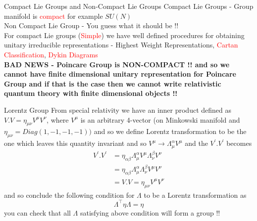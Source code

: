 \documentclass{beamer}
\begin{document}
\begin{frame}{Compact Lie Groups and Non-Compact Lie Groups}
Compact Lie Groups - Group manifold is \textcolor{red}{compact} for example $SU(N)$ \\
\vspace{5mm}
Non Compact Lie Group - You guess what it should be !! \\
\vspace{8mm}
For compact Lie groups (\textcolor{red}{Simple}) we have well defined procedures for obtaining unitary irreducible representations - Highest Weight Representations, \textcolor{red}{Cartan Classification}, \textcolor{red}{Dykin Diagrams} \\
\vspace{10mm} 
\textbf{BAD NEWS - Poincare Group is NON-COMPACT !! and so we cannot have finite dimensional unitary representation for Poincare Group and if that is the case then we cannot write relativistic quantum theory with finite dimensional objects !!}
\end{frame}
\begin{frame}{Lorentz Group}
    From special relativity we have an inner product defined as $V.V = \eta_{\mu\nu}V^{\mu}V^{\nu}$, where $V^{\mu}$ is an arbitrary 4-vector (on Minkowski manifold and $\eta_{\mu\nu} = Diag(1, -1, -1, -1))$
    and so we define Lorentz transformation to be the one which leaves this quantity invariant and so $V^{\mu}\to \Lambda^{\alpha}_{\mu}V^{\mu}$ and the  $V^{\prime}.V^{\prime}$ becomes 
    \begin{align}
        V^{\prime}.V^{\prime} &= \eta_{\alpha\beta}\Lambda^{\alpha}_{\mu}V^{\mu}\Lambda^{\beta}_{\nu}V^{\nu} \\
            &= \eta_{\alpha\beta}\Lambda^{\alpha}_{\mu}\Lambda^{\beta}_{\nu}V^{\mu}V^{\nu} \\
            &= V.V = \eta_{\mu\nu}V^{\mu}V^{\nu}
    \end{align} and so conclude the following condition for $\Lambda$ to be a Lorentz transformation as
    \begin{equation}
        \Lambda^{\intercal}\eta\Lambda = \eta
    \end{equation}
    you can check that all $\Lambda$ satisfying above condition will form a group !!
\end{frame} 
\end{document}
